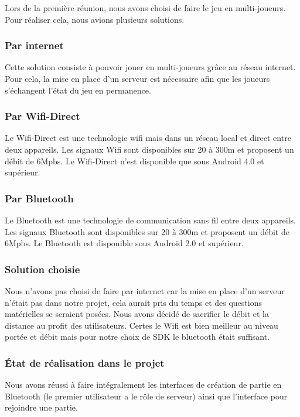 \documentclass{report}
\begin{document}
Lors de la première réunion, nous avons choisi de faire le jeu en
multi-joueurs. Pour réaliser cela, nous avions plusieurs solutions.

\subsubsection{Par internet}

Cette solution consiste à pouvoir jouer en multi-joueurs grâce au réseau
internet. Pour cela, la mise en place d’un serveur est nécessaire afin
que les joueurs s’échangent l’état du jeu en permanence.

\subsubsection{Par Wifi-Direct}

Le Wifi-Direct est une technologie wifi mais dans un réseau local et
direct entre deux appareils. Les signaux Wifi sont disponibles sur 20
à 300m et proposent un débit de 6Mpbs.
Le Wifi-Direct n’est disponible que sous Android 4.0 et supérieur.

\subsubsection{Par Bluetooth}

Le Bluetooth est une technologie de communication sans fil entre deux
appareils. Les signaux Bluetooth sont disponibles sur 20 à 300m et
proposent un débit de 6Mpbs.
Le Bluetooth est disponible sous Android 2.0 et supérieur.

\subsubsection{Solution choisie}

Nous n’avons pas choisi de faire par internet car la mise en place d’un
serveur n’était pas dans notre projet, cela aurait pris du temps et des
questions matérielles se seraient posées. Nous avons décidé de sacrifier
le débit et la distance au profit des utilisateurs. Certes le Wifi est
bien meilleur au niveau portée et débit mais pour notre choix de SDK le
bluetooth était suffisant.

\subsubsection{État de réalisation dans le projet}

Nous avons réussi à faire intégralement les interfaces de création de
partie en Bluetooth (le premier utilisateur a le rôle de serveur) ainsi
que l’interface pour rejoindre une partie.
\end{document}
